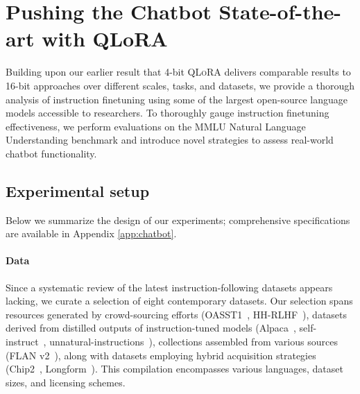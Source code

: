 \section{Pushing the Chatbot State-of-the-art with QLoRA}
\label{sec:pushing}
Building upon our earlier result that 4-bit \textsc{QLoRA} delivers comparable results to 16-bit approaches over different scales, tasks, and datasets, we provide a thorough analysis of instruction finetuning using some of the largest open-source language models accessible to researchers. To thoroughly gauge instruction finetuning effectiveness, we perform evaluations on the MMLU Natural Language Understanding benchmark and introduce novel strategies to assess real-world chatbot functionality.

\subsection{Experimental setup} Below we summarize the design of our experiments; comprehensive specifications are available in Appendix \ref{app:chatbot}.

\paragraph{Data} Since a systematic review of the latest instruction-following datasets appears lacking, we curate a selection of eight contemporary datasets. Our selection spans resources generated by crowd-sourcing efforts (OASST1~\citep{kopf2023openassistant}, HH-RLHF~\citep{bai2022training}), datasets derived from distilled outputs of instruction-tuned models (Alpaca~\citep{alpaca}, self-instruct~\citep{wang2022self}, unnatural-instructions~\citep{honovich2022unnatural}), collections assembled from various sources (FLAN v2~\citep{chung2022scaling}), along with datasets employing hybrid acquisition strategies (Chip2~\citep{laion2023}, Longform~\citep{koksal2023longform}). This compilation encompasses various languages, dataset sizes, and licensing schemes.

